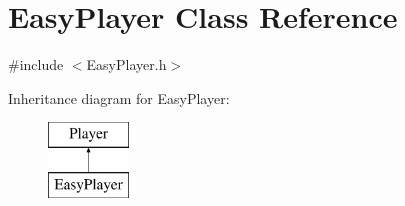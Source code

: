 \hypertarget{class_easy_player}{}\section{Easy\+Player Class Reference}
\label{class_easy_player}


{\ttfamily \#include $<$Easy\+Player.\+h$>$}

Inheritance diagram for Easy\+Player\+:\begin{figure}[H]
\begin{center}
\leavevmode
\includegraphics[height=2.000000cm]{class_easy_player}
\end{center}
\end{figure}
